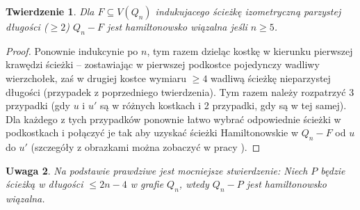 \documentclass{pracamgr}
\newtheorem{theorem}{Twierdzenie}
\newtheorem{remark}[theorem]{Uwaga}
\begin{document}
     \begin{theorem}\label{hamilton - sciezka, parz}
      Dla $F\subseteq V(Q_n)$ indukujacego ścieżkę izometryczną parzystej długości ($\ge2$) $Q_n-F$ jest hamiltonowsko wiązalna jeśli $n\ge5$.
     \end{theorem}
     \begin{proof}
      Ponownie indukcynie po $n$, tym razem dzieląc kostkę w kierunku pierwszej krawędzi ścieżki -- zostawiając w pierwszej podkostce pojedynczy wadliwy wierzchołek,
      zaś w drugiej kostce wymiaru $\ge4$ wadliwą ścieżkę nieparzystej długości (przypadek z poprzedniego twierdzenia).
      Tym razem należy rozpatrzyć 3 przypadki (gdy $u$ i $u'$ są w różnych kostkach i 2 przypadki, gdy są w tej samej).
      Dla każdego z tych przypadków ponownie łatwo wybrać odpowiednie ścieżki w podkostkach i połączyć je tak aby uzyskać ścieżki Hamiltonowskie w
      $Q_n-F$ od $u$ do $u'$ (szczegóły z obrazkami można zobaczyć w pracy \cite{Pegr}).
     \end{proof}
     \begin{remark}
      Na podstawie \cite{SCJY} prawdziwe jest mocniejsze stwierdzenie:\newline
      Niech $P$ będzie ścieżką w długości $\le 2n-4$ w grafie $Q_n$, wtedy $Q_n-P$ jest hamiltonowsko wiązalna.
     \end{remark}
\end{document}
